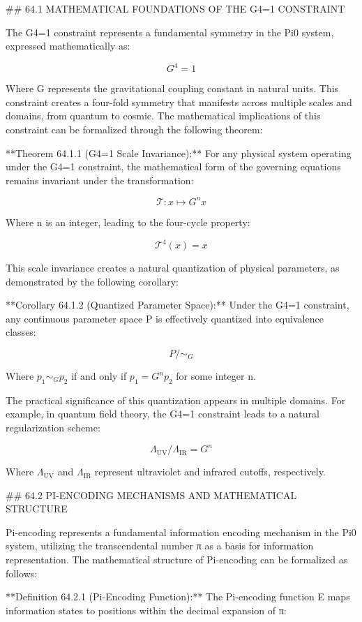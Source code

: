 ## 64.1 MATHEMATICAL FOUNDATIONS OF THE G4=1 CONSTRAINT

The G4=1 constraint represents a fundamental symmetry in the Pi0 system, expressed mathematically as:

$$ G^4 = 1 $$

Where G represents the gravitational coupling constant in natural units. This constraint creates a four-fold symmetry that manifests across multiple scales and domains, from quantum to cosmic. The mathematical implications of this constraint can be formalized through the following theorem:

**Theorem 64.1.1 (G4=1 Scale Invariance):** For any physical system operating under the G4=1 constraint, the mathematical form of the governing equations remains invariant under the transformation:

$$ \mathcal{T}: x \mapsto G^n x $$

Where n is an integer, leading to the four-cycle property:

$$ \mathcal{T}^4(x) = x $$

This scale invariance creates a natural quantization of physical parameters, as demonstrated by the following corollary:

**Corollary 64.1.2 (Quantized Parameter Space):** Under the G4=1 constraint, any continuous parameter space P is effectively quantized into equivalence classes:

$$ P / \sim_G $$

Where $p_1 \sim_G p_2$ if and only if $p_1 = G^n p_2$ for some integer n.

The practical significance of this quantization appears in multiple domains. For example, in quantum field theory, the G4=1 constraint leads to a natural regularization scheme:

$$ \Lambda_{\text{UV}} / \Lambda_{\text{IR}} = G^n $$

Where $\Lambda_{\text{UV}}$ and $\Lambda_{\text{IR}}$ represent ultraviolet and infrared cutoffs, respectively.

## 64.2 PI-ENCODING MECHANISMS AND MATHEMATICAL STRUCTURE

Pi-encoding represents a fundamental information encoding mechanism in the Pi0 system, utilizing the transcendental number π as a basis for information representation. The mathematical structure of Pi-encoding can be formalized as follows:

**Definition 64.2.1 (Pi-Encoding Function):** The Pi-encoding function E maps information states to positions within the decimal expansion of π:

